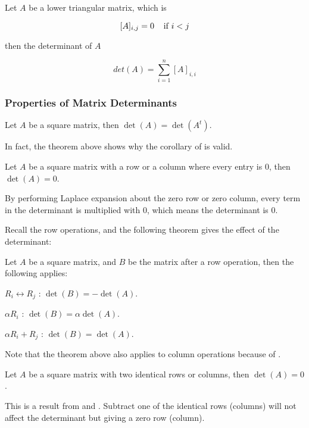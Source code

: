 \documentclass[a4paper,12pt]{article}
\begin{document}
\begin{crl}
  Let $A$ be a lower triangular matrix, which is

  $$[A]_{i,j}=0\;\;\;\;\text{if }i<j$$\s

  then the determinant of $A$

  $$det(A)=\sum_{i=1}^{n}[A]_{i,i}$$
\end{crl}

\subsubsection{Properties of Matrix Determinants}
\begin{thm}
  Let $A$ be a square matrix, then $\det(A)=\det(A^{t})$.
\end{thm}\n

In fact, the theorem above shows why the corollary of \rthm[\sctd{1}] is valid.\n

\begin{thm}
  Let $A$ be a square matrix with a row or a column where every entry is $0$, then $\det(A)=0$.\n

  \prf By performing Laplace expansion about the zero row or zero column, every term in the determinant is multiplied with $0$, which means the determinant is $0$.
\end{thm}\n

Recall the row operations, and the following theorem gives the effect of the determinant:

\begin{thm}
  Let $A$ be a square matrix, and $B$ be the matrix after a row operation, then the following applies:

  \begin{alist}
    \item $R_{i}\leftrightarrow R_{j}$ : $\det(B)=-\det(A)$.
    \item $\alpha R_{i}$ : $\det(B)=\alpha\det(A)$.
    \item $\alpha R_{i}+R_{j}$ : $\det(B)=\det(A)$.
  \end{alist}
\end{thm}\n

Note that the theorem above also applies to column operations because of \rthm[\sctd{2}].\n

\begin{thm}
  Let $A$ be a square matrix with two identical rows or columns, then $\det(A)=0$.\n
  
  \prf This is a result from \rthm[\sctd{2}] and \rthm[\sctd{1}]. Subtract one of the identical rows (columns) will not affect the determinant but giving a zero row (column).
\end{thm}\n
\end{document}
